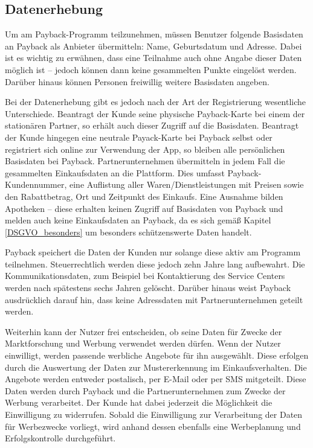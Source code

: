 \subsection{Datenerhebung}
Um am Payback-Programm teilzunehmen, müssen Benutzer folgende Basisdaten an Payback als Anbieter übermitteln: Name, Geburtsdatum und Adresse. Dabei ist es wichtig zu erwähnen, dass eine Teilnahme auch ohne Angabe dieser Daten möglich ist -- jedoch können dann keine gesammelten Punkte eingelöst werden. \cite{Payback_Teilnahme} Darüber hinaus können Personen freiwillig weitere Basisdaten angeben. \cite{Payback_Datenschutz} \newline

\noindent Bei der Datenerhebung gibt es jedoch nach der Art der Registrierung wesentliche Unterschiede. Beantragt der Kunde seine physische Payback-Karte bei einem der stationären Partner, so erhält auch dieser Zugriff auf die Basisdaten. Beantragt der Kunde hingegen eine neutrale Payack-Karte bei Payback selbst oder registriert sich online zur Verwendung der App, so bleiben alle persönlichen Basisdaten bei Payback. Partnerunternehmen übermitteln in jedem Fall die gesammelten Einkaufsdaten an die Plattform. Dies umfasst Payback-Kundennummer, eine Auflistung aller Waren/Dienstleistungen mit Preisen sowie den Rabattbetrag, Ort und Zeitpunkt des Einkaufs. Eine Ausnahme bilden Apotheken -- diese erhalten keinen Zugriff auf Basisdaten von Payback und melden auch keine Einkaufsdaten an Payback, da es sich gemäß Kapitel \ref{DSGVO_besonders} um besonders schützenswerte Daten handelt. \cite{Payback_Datenschutz} \newline

\noindent Payback speichert die Daten der Kunden nur solange diese aktiv am Programm teilnehmen. Steuerrechtlich werden diese jedoch zehn Jahre lang aufbewahrt. Die Kommunikationsdaten, zum Beispiel bei Kontaktierung des Service Centers werden nach spätestens sechs Jahren gelöscht. Darüber hinaus weist Payback ausdrücklich darauf hin, dass keine Adressdaten mit Partnerunternehmen geteilt werden. \cite{Payback_Datenschutz} \newline

\noindent Weiterhin kann der Nutzer frei entscheiden, ob seine Daten für Zwecke der Marktforschung und Werbung verwendet werden dürfen. Wenn der Nutzer einwilligt, werden passende werbliche Angebote für ihn ausgewählt. Diese erfolgen durch die Auswertung der Daten zur Mustererkennung im Einkaufsverhalten. Die Angebote werden entweder postalisch, per E-Mail oder per SMS mitgeteilt. Diese Daten werden durch Payback und die Partnerunternehmen zum Zwecke der Werbung verarbeitet. Der Kunde hat dabei jederzeit die Möglichkeit die Einwilligung zu widerrufen. Sobald die Einwilligung zur Verarbeitung der Daten für Werbezwecke vorliegt, wird anhand dessen ebenfalls eine Werbeplanung und Erfolgskontrolle durchgeführt. \cite{Payback_Datenschutz} \newline

